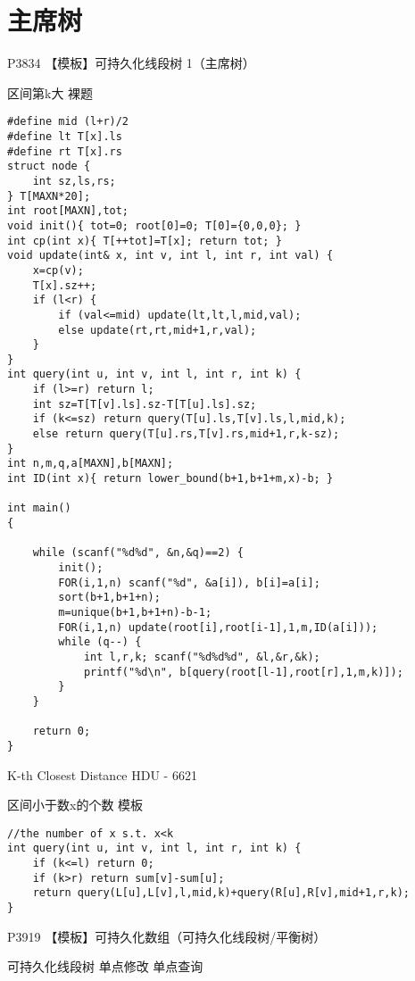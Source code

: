 \section{主席树}

P3834 【模板】可持久化线段树 1（主席树）

区间第k大 裸题

\begin{lstlisting}
#define mid (l+r)/2
#define lt T[x].ls
#define rt T[x].rs
struct node {
    int sz,ls,rs;
} T[MAXN*20];
int root[MAXN],tot;
void init(){ tot=0; root[0]=0; T[0]={0,0,0}; }
int cp(int x){ T[++tot]=T[x]; return tot; }
void update(int& x, int v, int l, int r, int val) {
    x=cp(v);
    T[x].sz++;
    if (l<r) {
        if (val<=mid) update(lt,lt,l,mid,val);
        else update(rt,rt,mid+1,r,val);
    }
}
int query(int u, int v, int l, int r, int k) {
    if (l>=r) return l;
    int sz=T[T[v].ls].sz-T[T[u].ls].sz;
    if (k<=sz) return query(T[u].ls,T[v].ls,l,mid,k);
    else return query(T[u].rs,T[v].rs,mid+1,r,k-sz);
}
int n,m,q,a[MAXN],b[MAXN];
int ID(int x){ return lower_bound(b+1,b+1+m,x)-b; }

int main()
{

    while (scanf("%d%d", &n,&q)==2) {
        init();
        FOR(i,1,n) scanf("%d", &a[i]), b[i]=a[i];
        sort(b+1,b+1+n);
        m=unique(b+1,b+1+n)-b-1;
        FOR(i,1,n) update(root[i],root[i-1],1,m,ID(a[i]));
        while (q--) {
            int l,r,k; scanf("%d%d%d", &l,&r,&k);
            printf("%d\n", b[query(root[l-1],root[r],1,m,k)]);
        }
    }

    return 0;
}
\end{lstlisting}

K-th Closest Distance HDU - 6621

区间小于数x的个数 模板

\begin{lstlisting}
//the number of x s.t. x<k
int query(int u, int v, int l, int r, int k) {
    if (k<=l) return 0;
    if (k>r) return sum[v]-sum[u];
    return query(L[u],L[v],l,mid,k)+query(R[u],R[v],mid+1,r,k);
}
\end{lstlisting}

P3919 【模板】可持久化数组（可持久化线段树/平衡树）

可持久化线段树 单点修改 单点查询

